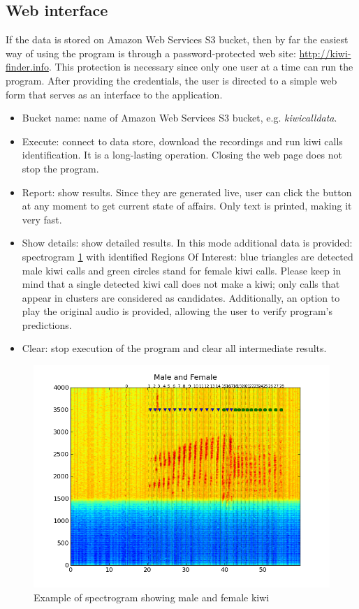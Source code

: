 \documentclass[paper=a4, fontsize=11pt]{scrartcl}	%
\numberwithin{equation}{section}		%
\numberwithin{figure}{section}			%
\numberwithin{table}{section}				%
\begin{document}
\subsection{Web interface}
\label{sec:web_interface}
If the data is stored on Amazon Web Services S3 bucket, then by far the easiest way of using the program is through a password-protected web site: \url{http://kiwi-finder.info}. This protection is necessary since only one user at a time can run the program. \newline
After providing the credentials, the user is directed to a simple web form that serves as an interface to the application. 
\begin{itemize}
	\item Bucket name: name of Amazon Web Services S3 bucket, e.g. \textit{kiwicalldata}.
	\item Execute: connect to data store, download the recordings and run kiwi calls identification. It is a long-lasting operation. Closing the web page does not stop the program.
	\item Report: show results. Since they are generated live, user can click the button at any moment to get current state of affairs. Only text is printed, making it very fast.
	\item Show details: show detailed results. In this mode additional data is provided: spectrogram \ref{fig:spectrogram} with identified Regions Of Interest: blue triangles are detected male kiwi calls and green circles stand for female kiwi calls. Please keep in mind that a single detected kiwi call does not make a kiwi; only calls that appear in clusters are considered as candidates. Additionally, an option to play the original audio is provided, allowing the user to verify program's predictions.
	\item Clear: stop execution of the program and clear all intermediate results.
\end{itemize}

\begin{figure}[hbtp]
\label{fig:spectrogram}
\caption{Example of spectrogram showing male and female kiwi}
\centering
\includegraphics[scale=0.8]{spectrogram.png}
\end{figure}
\end{document}
